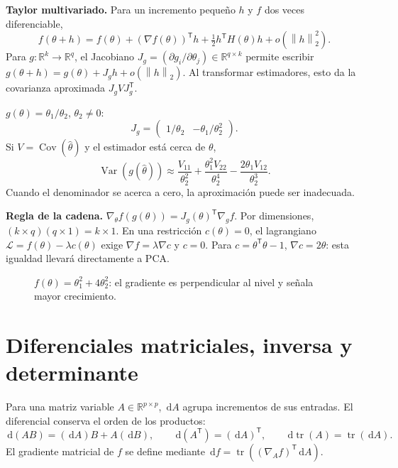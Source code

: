 \documentclass[11pt,a4paper]{article}
\newcommand{\R}{\mathbb R}
\newcommand{\T}{^{\mathsf T}}
\newcommand{\dd}{\,\mathrm d}
\newcommand{\norm}[1]{\left\lVert #1\right\rVert}
\DeclareMathOperator{\Var}{Var}
\DeclareMathOperator{\Cov}{Cov}
\DeclareMathOperator{\tr}{tr}
\newcommand{\topic}[2]{\clearpage\section{#1}\label{#2}}
\theoremstyle{definition}\newtheorem{definicion}[teorema]{Definición}
\begin{document}
\textbf{Taylor multivariado.} Para un incremento pequeño $h$ y $f$ dos
veces diferenciable,
\[
f(\theta+h)=f(\theta)+(\nabla f(\theta))\T h
+\tfrac12h\T H(\theta)h+o(\norm h_2^2).
\]
Para $g:\R^k\to\R^q$, el Jacobiano
$J_g=(\partial g_i/\partial\theta_j)\in\R^{q\times k}$ permite escribir
$g(\theta+h)=g(\theta)+J_gh+o(\norm h_2)$.
Al transformar estimadores, esto da la covarianza aproximada $J_gVJ_g\T$.

\begin{ejemplo}
$g(\theta)=\theta_1/\theta_2$, $\theta_2\ne0$:
\[
J_g=\begin{pmatrix}1/\theta_2&-\theta_1/\theta_2^2\end{pmatrix}.
\]
Si $V=\Cov(\widehat\theta)$ y el estimador está cerca de $\theta$,
\[
\Var(g(\widehat\theta))\approx
\frac{V_{11}}{\theta_2^2}
+\frac{\theta_1^2V_{22}}{\theta_2^4}
-\frac{2\theta_1V_{12}}{\theta_2^3}.
\]
Cuando el denominador se acerca a cero, la aproximación puede ser inadecuada.
\end{ejemplo}
\textbf{Regla de la cadena.}
$\nabla_\theta f(g(\theta))=J_g(\theta)\T\nabla_g f$.
Por dimensiones, $(k\times q)(q\times1)=k\times1$.
En una restricción $c(\theta)=0$, el lagrangiano
$\mathcal L=f(\theta)-\lambda c(\theta)$ exige
$\nabla f=\lambda\nabla c$ y $c=0$. Para $c=\theta\T\theta-1$,
$\nabla c=2\theta$: esta igualdad llevará directamente a PCA.

\begin{figure}[H]\centering
{}
\caption{$f(\theta)=\theta_1^2+4\theta_2^2$: el gradiente es perpendicular al nivel y señala mayor crecimiento.}
\end{figure}
\topic{Diferenciales matriciales, inversa y determinante}{s16}
Para una matriz variable $A\in\R^{p\times p}$, $\dd A$ agrupa incrementos
de sus entradas. El diferencial conserva el orden de los productos:
\[
\dd(AB)=(\dd A)B+A(\dd B),\qquad
\dd(A\T)=(\dd A)\T,\qquad
\dd\tr(A)=\tr(\dd A).
\]
El gradiente matricial de $f$ se define mediante
$\dd f=\tr((\nabla_Af)\T\dd A)$.
\end{document}
